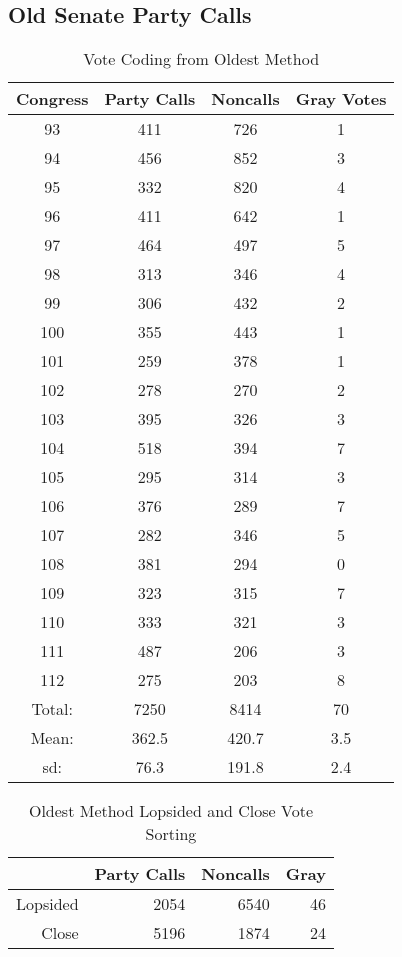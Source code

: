 \documentclass[12pt]{article}
\begin{document}
\pagebreak

\subsection{Old Senate Party Calls}

\begin{table}[ht]
	\caption{Vote Coding from Oldest Method}
	\centering
	\begin{tabular}{cccc}
		\hline
		Congress & Party Calls & Noncalls & Gray Votes \\ 
		\hline
		93 & 411 & 726 &   1 \\ 
		94 & 456 & 852 &   3 \\ 
		95 & 332 & 820 &   4 \\ 
		96 & 411 & 642 &   1 \\ 
		97 & 464 & 497 &   5 \\ 
		98 & 313 & 346 &   4 \\ 
		99 & 306 & 432 &   2 \\ 
		100 & 355 & 443 &   1 \\ 
		101 & 259 & 378 &   1 \\ 
		102 & 278 & 270 &   2 \\ 
		103 & 395 & 326 &   3 \\ 
		104 & 518 & 394 &   7 \\ 
		105 & 295 & 314 &   3 \\ 
		106 & 376 & 289 &   7 \\ 
		107 & 282 & 346 &   5 \\ 
		108 & 381 & 294 &   0 \\ 
		109 & 323 & 315 &   7 \\ 
		110 & 333 & 321 &   3 \\ 
		111 & 487 & 206 &   3 \\ 
		112 & 275 & 203 &   8 \\ 
		\hline
		Total: & 7250 & 8414 & 70 \\
		Mean: & 362.5 & 420.7 & 3.5 \\
		sd: & 76.3 & 191.8 & 2.4 \\
		\hline
	\end{tabular}
\end{table}

\begin{table}[ht]
	\caption{Oldest Method Lopsided and Close Vote Sorting}
	\centering
	\begin{tabular}{rrrr}
		\hline
		& Party Calls & Noncalls & Gray \\ 
		\hline
		Lopsided &  2054 & 6540 & 46 \\ 
		Close & 5196  & 1874 & 24 \\ 
		\hline
	\end{tabular}
\end{table}
\end{document}
